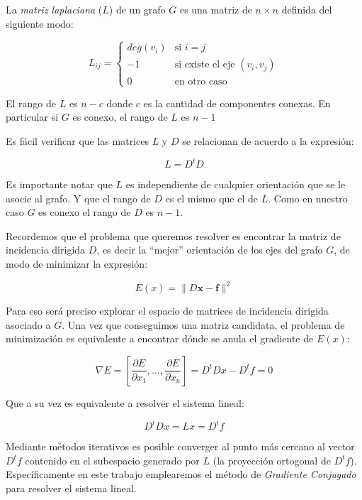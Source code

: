 \documentclass[conference,compsoc,a4paper]{IEEEtran}
\begin{document}
La \textit{matriz laplaciana} ($L$) de un grafo $G$ es una matriz de 
$n \times n$ definida del siguiente modo:

$$
	L_{ij} =
	\begin{cases}
	deg(v_i) & \text{si $i = j$} \\
	-1 & \text{si existe el eje $(v_i,v_j)$} \\
	0 & \text{en otro caso} 
	\end{cases}
$$

El rango de $L$ es $n-c$ donde $c$ es la cantidad de componentes 
conexas. En particular si $G$ es conexo, el rango de $L$ es $n-1$

\bigskip


Es fácil verificar que las matrices $L$ y $D$ se relacionan de acuerdo
a la expresión:

$$L = D^t D$$

Es importante notar que $L$ es independiente de cualquier orientación 
que se le asocie al grafo. Y que el rango de $D$ es el mismo que el de 
$L$. Como en nuestro caso $G$ es conexo el rango de $D$ es $n-1$.

\bigskip


Recordemos que el problema que queremos resolver es encontrar la matriz 
de incidencia dirigida $D$, es decir la ``mejor'' 
orientación de los ejes 
del grafo $G$, de modo de minimizar la expresión:

$$E(x) = \|D\bm{x}-\bm{f}\|^2$$

Para eso será preciso explorar el espacio de matrices de 
incidencia dirigida asociado a $G$. Una vez que conseguimos una 
matriz candidata, el problema de minimización es equivalente a encontrar
dónde se anula el gradiente de $E(x)$:
 
$$\nabla E = \left[\frac{\partial E}{\partial x_1}, \dots, \frac{\partial 
E}{\partial x_n}\right] = D^tDx-D^tf=0$$

\noindent Que a su vez es equivalente a resolver el sistema lineal:

$$D^tDx = Lx = D^tf$$

Mediante métodos iterativos es posible converger al punto más cercano 
al vector $D^tf$ contenido en el subespacio generado por $L$ (la 
proyección ortogonal de $D^tf$). Específicamente en este trabajo 
emplearemos el método de \textit{Gradiente Conjugado} \cite{Saad:2007} 
para resolver el sistema lineal.
\end{document}

